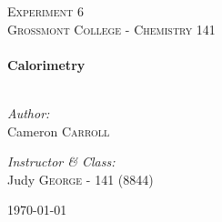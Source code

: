 \begin{titlepage}
\begin{center}

\textsc{\Large Experiment 6}\\[1.5cm]
\textsc{\Large Grossmont College - Chemistry 141}\\[0.5cm]

\HRule \\[0.4cm]
{ \LARGE \bfseries Calorimetry}\\[0.5cm]

\HRule \\[1.5cm]

\begin{minipage}{0.4\textwidth}
\begin{flushleft} \large
\emph{Author:}\\
Cameron \textsc{Carroll}
\end{flushleft}
\end{minipage}
\begin{minipage}{0.4\textwidth}
\begin{flushright} \large
\emph{Instructor \& Class:}\\
Judy \textsc{George} - 141 (8844)
\end{flushright}
\end{minipage}

\vfill

{\large \today}

\end{center}
\end{titlepage}
